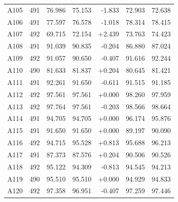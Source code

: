 \begin{longtable}{lrrrrrr}
A105 & 491 & 76.986 & 75.153 & -1.833 & 72.903 & 72.638 \\
A106 & 491 & 77.597 & 76.578 & -1.018 & 78.314 & 78.415 \\
A107 & 492 & 69.715 & 72.154 & +2.439 & 73.763 & 74.423 \\
A108 & 491 & 91.039 & 90.835 & -0.204 & 86.880 & 87.024 \\
A109 & 492 & 91.057 & 90.650 & -0.407 & 91.616 & 92.244 \\
A110 & 490 & 81.633 & 81.837 & +0.204 & 80.645 & 81.421 \\
A111 & 491 & 92.261 & 91.650 & -0.611 & 91.515 & 91.185 \\
A112 & 492 & 97.561 & 97.561 & +0.000 & 98.260 & 97.959 \\
A113 & 492 & 97.764 & 97.561 & -0.203 & 98.566 & 98.664 \\
A114 & 491 & 94.705 & 94.705 & +0.000 & 96.174 & 95.876 \\
A115 & 491 & 91.650 & 91.650 & +0.000 & 89.197 & 90.090 \\
A116 & 492 & 94.715 & 95.528 & +0.813 & 95.688 & 96.213 \\
A117 & 491 & 87.373 & 87.576 & +0.204 & 90.506 & 90.526 \\
A118 & 492 & 95.122 & 94.309 & -0.813 & 94.545 & 94.213 \\
A119 & 490 & 95.510 & 95.510 & +0.000 & 94.929 & 94.833 \\
A120 & 492 & 97.358 & 96.951 & -0.407 & 97.259 & 97.446 \\
\bottomrule
\end{longtable}

